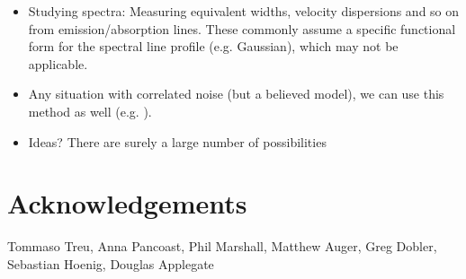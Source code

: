 \documentclass[letterpaper, 11pt]{article}
\begin{document}
\begin{itemize}
\item Studying spectra: Measuring equivalent widths, velocity dispersions and so on from emission/absorption lines. These commonly assume a specific functional form for the spectral line profile (e.g. Gaussian), which may not be applicable.

\item Any situation with correlated noise (but a believed model), we can use this method as well (e.g. \citep{2008ApJ...686..851R}).

\item Ideas? There are surely a large number of possibilities
\end{itemize}

\section*{Acknowledgements}
Tommaso Treu, Anna Pancoast, Phil Marshall, Matthew Auger, Greg Dobler, Sebastian Hoenig, Douglas Applegate
\end{document}
